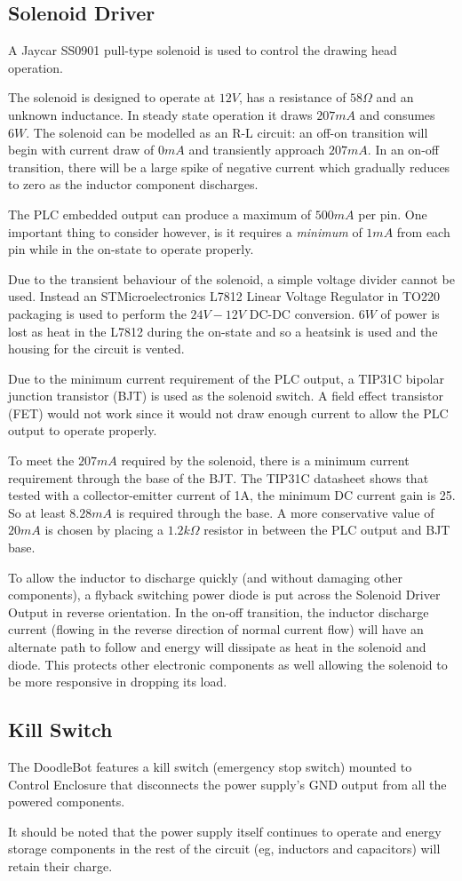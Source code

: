 	\subsection{Solenoid Driver}
		A Jaycar SS0901 pull-type solenoid is used to control the drawing head operation.
		
		The solenoid is designed to operate at $12V$, has a resistance of $58\Omega$ and an unknown inductance. In steady state operation it draws $207mA$ and consumes $6W$. The solenoid can be modelled as an R-L circuit: an off-on transition will begin with current draw of $0mA$ and transiently approach $207mA$. In an on-off transition, there will be a large spike of negative current which gradually reduces to zero as the inductor component discharges.
		
		The PLC embedded output can produce a maximum of $500mA$ per pin. One important thing to consider however, is it requires a \emph{minimum} of $1mA$ from each pin while in the on-state to operate properly. 
		
		Due to the transient behaviour of the solenoid, a simple voltage divider cannot be used. Instead an STMicroelectronics L7812 Linear Voltage Regulator in TO220 packaging is used to perform the $24V-12V$ DC-DC conversion. $6W$ of power is lost as heat in the L7812 during the on-state and so a heatsink is used and the housing for the circuit is vented.
		
		Due to the minimum current requirement of the PLC output, a TIP31C bipolar junction transistor (BJT) is used as the solenoid switch. A field effect transistor (FET) would not work since it would not draw enough current to allow the PLC output to operate properly.
		
		To meet the $207mA$ required by the solenoid, there is a minimum current requirement through the base of the BJT. The TIP31C datasheet shows that tested with a collector-emitter current of 1A, the minimum DC current gain is 25. So at least $8.28mA$ is required through the base. A more conservative value of $20mA$ is chosen by placing a $1.2k\Omega$ resistor in between the PLC output and BJT base.
		
		To allow the inductor to discharge quickly (and without damaging other components), a flyback switching power diode is put across the Solenoid Driver Output in reverse orientation. In the on-off transition, the inductor discharge current (flowing in the reverse direction of normal current flow) will have an alternate path to follow and energy will dissipate as heat in the solenoid and diode. This protects other electronic components as well allowing the solenoid to be more responsive in dropping its load.
		
	\subsection{Kill Switch}
		The DoodleBot features a kill switch (emergency stop switch) mounted to Control Enclosure that disconnects the power supply's GND output from all the powered components. 
		
		It should be noted that the power supply itself continues to operate and energy storage components in the rest of the circuit (eg, inductors and capacitors) will retain their charge.


